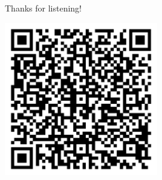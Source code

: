\documentclass[aspectratio=169]{beamer}
\begin{document}
\begin{frame}{Thanks for listening!}
  \vfill
  \begin{center}
    \includegraphics[width=0.5\textwidth]{images/qr.png}
  \end{center}
  \vfill
\end{frame}
\end{document}
